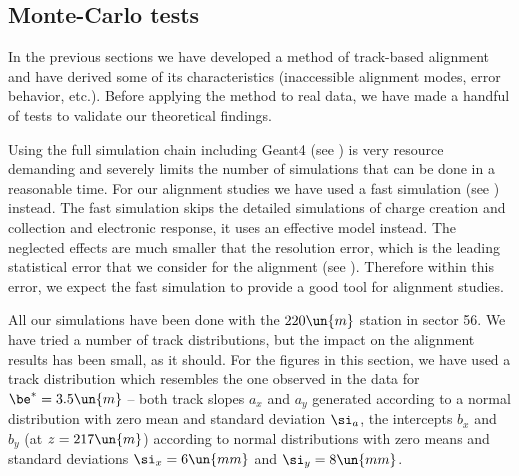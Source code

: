 \subsection[al mc tests]{Monte-Carlo tests}

In the previous sections we have developed a method of track-based alignment and have derived some of its characteristics (inaccessible alignment modes, error behavior, etc.). Before applying the method to real  data, we have made a handful of  tests to validate our theoretical findings.

Using the full simulation chain including Geant4 (see ) is very resource demanding and severely limits the number of simulations that can be done in a reasonable time. For our alignment studies we have used a fast simulation (see ) instead. The fast simulation skips the detailed simulations of charge creation and collection and electronic response, it uses an effective model instead. The neglected effects are much smaller that the resolution error, which is the leading statistical error that we consider for the alignment (see ). Therefore within this error, we expect the fast simulation to provide a good tool for alignment studies.

All our simulations have been done with the $220\un{m}$ station in sector 56. We have tried a number of track distributions, but the impact on the alignment results has been small, as it should. For the figures in this section, we have used a track distribution which resembles the one observed in the  data for $\be^* = 3.5\un{m}$ -- both track slopes $a_x$ and $a_y$ generated according to a normal distribution with zero mean and standard deviation $\si_a$, the intercepts $b_x$ and $b_y$ (at $z=217\un{m}$) according to normal distributions with zero means and standard deviations $\si_x = 6\un{mm}$ and $\si_y= 8\un{mm}$.


